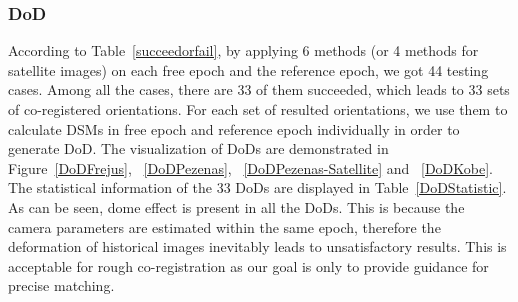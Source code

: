 %
%		
%		



\subsubsection{\ac{DoD}}
According to Table~\ref{succeedorfail}, by applying 6 methods (or 4 methods for satellite images) on each free epoch and the reference epoch, we got 44 testing cases. Among all the cases, there are 33 of them succeeded, which leads to 33 sets of co-registered orientations. For each set of resulted orientations, we use them to calculate DSMs in free epoch and reference epoch individually in order to generate \ac{DoD}. 
The visualization of \ac{DoD}s are demonstrated in Figure~\ref{DoDFrejus}, ~\ref{DoDPezenas}, ~\ref{DoDPezenas-Satellite} and ~\ref{DoDKobe}.
The statistical information of the 33 \ac{DoD}s are displayed in Table~\ref{DoDStatistic}.\\
As can be seen, dome effect is present in all the \ac{DoD}s. This is because the camera parameters are estimated within the same epoch, therefore the deformation of historical images inevitably leads to unsatisfactory results. This is acceptable for rough co-registration as our goal is only to provide guidance for precise matching.

